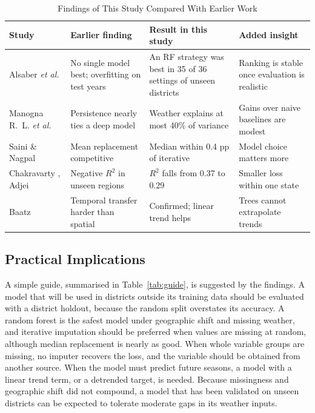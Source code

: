 \begin{table}[!t]
\caption{Findings of This Study Compared With Earlier Work}\label{tab:earlier}
\centering\footnotesize\setlength{\tabcolsep}{2.5pt}
\begin{tabular}{p{1.35cm}p{2.05cm}p{2.1cm}p{1.8cm}}
\toprule
Study & Earlier finding & Result in this study & Added insight \\
\midrule
Alsaber \emph{et al.} \cite{alsaber2025} & No single model best; overfitting on test years & An RF strategy was best in 35 of 36 settings of unseen districts & Ranking is stable once evaluation is realistic \\
Manogna R.~L. \emph{et al.} \cite{manogna2026} & Persistence nearly ties a deep model & Weather explains at most 40\% of variance & Gains over naive baselines are modest \\
Saini \& Nagpal \cite{saini2024} & Mean replacement competitive & Median within 0.4 pp of iterative & Model choice matters more \\
Chakravarty \cite{chakravarty2026}, Adjei \cite{adjei2026} & Negative $R^2$ in unseen regions & $R^2$ falls from 0.37 to 0.29 & Smaller loss within one state \\
Baatz \cite{baatz2025} & Temporal transfer harder than spatial & Confirmed; linear trend helps & Trees cannot extrapolate trends \\
\bottomrule
\end{tabular}
\end{table}

\subsection{Practical Implications}

A simple guide, summarised in Table~\ref{tab:guide}, is suggested by the findings. A model that
will be used in districts outside its training data should be evaluated with a district holdout,
because the random split overstates its accuracy. A random forest is the safest model under
geographic shift and missing weather, and iterative imputation should be preferred when values
are missing at random, although median replacement is nearly as good. When whole variable groups
are missing, no imputer recovers the loss, and the variable should be obtained from another
source. When the model must predict future seasons, a model with a linear trend term, or a
detrended target, is needed. Because missingness and geographic shift did not compound, a model
that has been validated on unseen districts can be expected to tolerate moderate gaps in its
weather inputs.

